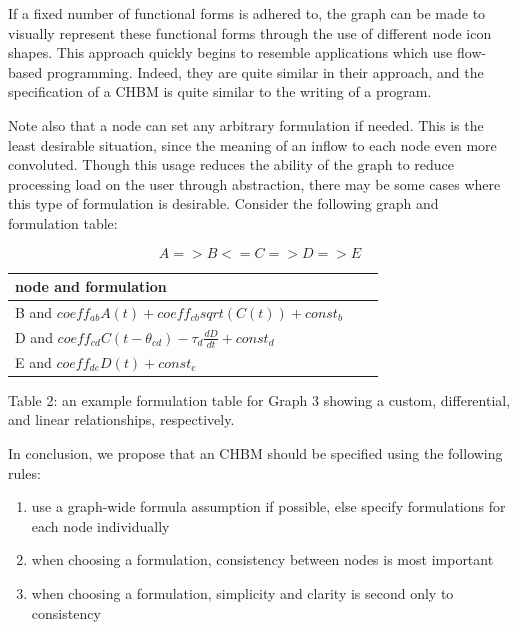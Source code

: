\documentclass[runningheads,a4paper]{llncs}
\begin{document}
If a fixed number of functional forms is adhered to, the graph can be made to visually represent these functional forms through the use of different node icon shapes. 
This approach quickly begins to resemble applications which use flow-based programming. 
Indeed, they are quite similar in their approach, and the specification of a CHBM is quite similar to the writing of a program.

Note also that a node can set any arbitrary formulation if needed. 
This is the least desirable situation, since the meaning of an inflow to each node even more convoluted. 
Though this usage reduces the ability of the graph to reduce processing load on the user through abstraction, there may be some cases where this type of formulation is desirable. 
Consider the following graph and formulation table:

\begin{equation}
    A => B <= C => D => E
\end{equation}

\begin{centering}
  \begin{tabular}{ | l | l | l |}
      \hline
      node and formulation \\ \hline
      B and $coeff_{ab}A(t) + coeff_{cb}sqrt(C(t)) + const_b$ \\ \hline
      D and $coeff_{cd}C(t-\theta_{cd}) - \tau_{d}\frac{dD}{dt} + const_{d}$ \\ \hline
      E and $coeff_{de}D(t) + const_{e}$ \\ \hline
  \end{tabular}

  Table 2: an example formulation table for Graph 3 showing a custom, differential, and linear relationships, respectively.
\end{centering}

In conclusion, we propose that an CHBM should be specified using the following rules:

\begin{enumerate}
  \item use a graph-wide formula assumption if possible, else specify formulations for each node individually
  \item when choosing a formulation, consistency between nodes is most important
  \item when choosing a formulation, simplicity and clarity is second only to consistency
\end{enumerate}
  
\end{document}
